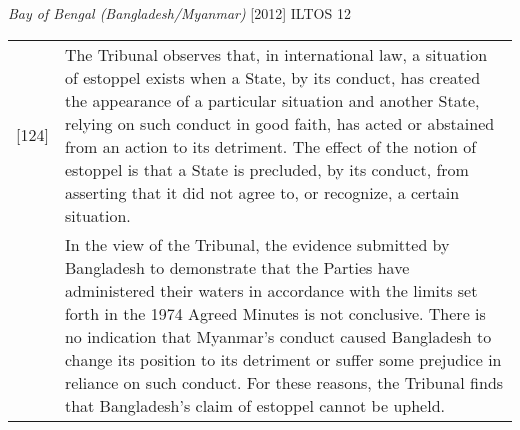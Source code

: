 \begin{casedetails}{\textit{Bay of Bengal (Bangladesh/Myanmar)} [2012] ILTOS 12}
    \begin{longtable}{r|>{\raggedright\arraybackslash}p{}}
        [124] & The Tribunal observes that, in international law, a situation of estoppel 
        exists when a State, by its conduct, has created the appearance of a particular 
        situation and another State, relying on such conduct in good faith, has acted or 
        abstained from an action to its detriment. The effect of the notion of estoppel is 
        that a State is precluded, by its conduct, from asserting that it did not agree to, 
        or recognize, a certain situation. \\[2.5cm]
        [125] & In the view of the Tribunal, the evidence submitted by Bangladesh to demonstrate that the Parties have administered their waters in accordance with the  limits set forth in the 1974 Agreed Minutes is not conclusive. There is no indication that Myanmar's conduct caused Bangladesh to change its position to its  detriment or suffer some prejudice in reliance on such conduct. For these reasons, the Tribunal finds that Bangladesh's claim of estoppel cannot be upheld.
    \end{longtable}    
\end{casedetails}

